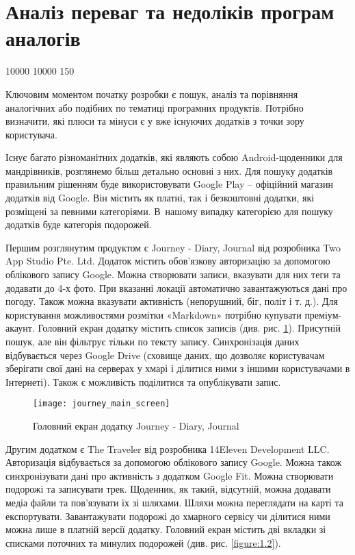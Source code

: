 \documentclass[../main.tex]{subfiles}
\begin{document}
\section{Аналіз переваг та недоліків програм аналогів}

{

 10000 10000 150 %

Ключовим моментом початку розробки є пошук, аналіз та порівняння аналогічних або подібних по тематиці програмних продуктів. Потрібно визначити, які плюси та мінуси є у вже існуючих додатків з точки зору користувача.

Існує багато різноманітних додатків, які являють собою Android-щоденники для мандрівників, розглянемо більш детально основні з них. Для пошуку додатків правильним рішенням буде використовувати Google Play -- офіційний магазин додатків від Google. Він містить як платні, так і безкоштовні додатки, які розміщені за певними категоріями. В~нашому випадку категорією для пошуку додатків буде категорія подорожей.

Першим розглянутим продуктом є Journey - Diary, Journal від розробника Two App Studio Pte. Ltd. Додаток містить обов'язкову авторизацію за допомогою облікового запису Google. Можна створювати записи, вказувати для них теги та додавати до 4-х фото. При вказанні локації автоматично завантажуються дані про погоду. Також можна вказувати активність (непорушний, біг, політ і т. д.). Для користування можливостями розмітки «Markdown» потрібно купувати преміум-акаунт. Головний екран додатку містить список записів (див. рис. \ref{figure:1.1}). Присутній пошук, але він фільтрує тільки по тексту запису. Синхронізація даних відбувається через Google Drive (сховище даних, що дозволяє користувачам зберігати свої дані на серверах у хмарі і ділитися ними з іншими користувачами в Інтернеті). Також є можливість поділитися та опублікувати запис. 

\begin{figure}[H]
\centering
\texttt{[image: journey\_main\_screen]}
\caption{Головний екран додатку Journey - Diary, Journal}
\label{figure:1.1}
\end{figure}

Другим додатком є The Traveler від розробника 14Eleven Development LLC. Авторизація відбувається за допомогою облікового запису Google. Можна також синхронізувати дані про активність з додатком Google Fit. Можна створювати подорожі та записувати трек. Щоденник, як такий, відсутній, можна додавати медіа файли та пов'язувати їх зі шляхами. Шляхи можна переглядати на карті та експортувати. Завантажувати подорожі до хмарного сервісу чи ділитися ними можна лише в платній версії додатку. Головний екран містить дві вкладки зі списками поточних та минулих подорожей (див. рис. \ref{figure:1.2}). 

}
\end{document}
